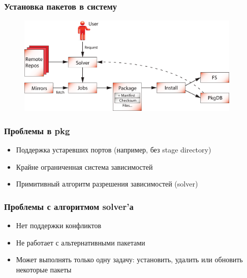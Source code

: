 \documentclass{beamer}
\begin{document}
\begin{frame}
\frametitle{Установка пакетов в систему}
\begin{figure}[h!]
  \centering
  \includegraphics[width=0.95\textwidth]{q4.eps}
\end{figure}
\end{frame}

\begin{frame}
\frametitle{Проблемы в pkg}
\begin{itemize}
  \item Поддержка устаревших портов (например, без stage directory)
  \item Крайне ограниченная система зависимостей
  \item Примитивный алгоритм разрешения зависимостей (solver)
\end{itemize}
\end{frame}

\begin{frame}
\frametitle{Проблемы с алгоритмом solver'а}

\begin{itemize}
\item Нет поддержки конфликтов
\item Не работает с альтернативными пакетами
\item Может выполнять только одну задачу: установить, удалить или обновить
некоторые пакеты
\end{itemize}

\end{frame}
\end{document}
